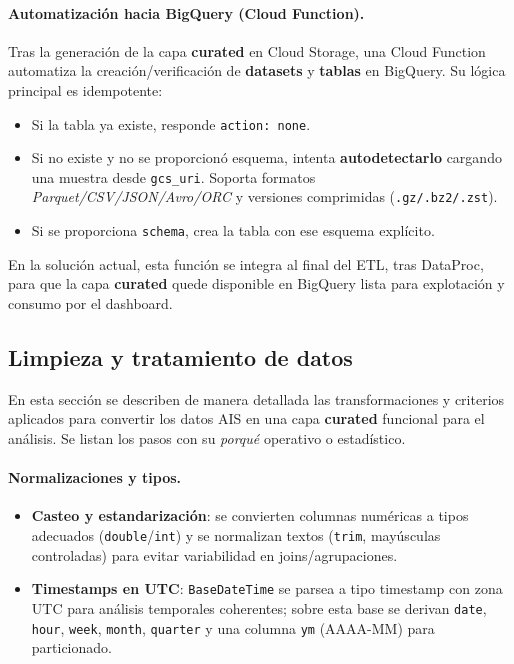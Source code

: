 \documentclass[10pt]{article}
\begin{document}
\paragraph{Automatización hacia BigQuery (Cloud Function).}
Tras la generación de la capa \textbf{curated} en Cloud Storage, una Cloud Function automatiza la creación/verificación de \textbf{datasets} y \textbf{tablas} en BigQuery. Su lógica principal es idempotente:
\begin{itemize}
    \item Si la tabla ya existe, responde \texttt{action: none}.
    \item Si no existe y no se proporcionó esquema, intenta \textbf{autodetectarlo} cargando una muestra desde \texttt{gcs\_uri}. Soporta formatos \textit{Parquet/CSV/JSON/Avro/ORC} y versiones comprimidas (\texttt{.gz/.bz2/.zst}).
    \item Si se proporciona \texttt{schema}, crea la tabla con ese esquema explícito.
\end{itemize}
En la solución actual, esta función se integra al final del ETL, tras DataProc, para que la capa \textbf{curated} quede disponible en BigQuery lista para explotación y consumo por el dashboard.
\subsection{Limpieza y tratamiento de datos} %

En esta sección se describen de manera detallada las transformaciones y criterios aplicados para convertir los datos AIS en una capa \textbf{curated} funcional para el análisis. Se listan los pasos con su \emph{porqué} operativo o estadístico.

\paragraph{Normalizaciones y tipos.}
\begin{itemize}
  \item \textbf{Casteo y estandarización}: se convierten columnas numéricas a tipos adecuados (\texttt{double}/\texttt{int}) y se normalizan textos (\texttt{trim}, mayúsculas controladas) para evitar variabilidad en joins/agrupaciones.
  \item \textbf{Timestamps en UTC}: \texttt{BaseDateTime} se parsea a tipo timestamp con zona UTC para análisis temporales coherentes; sobre esta base se derivan \texttt{date}, \texttt{hour}, \texttt{week}, \texttt{month}, \texttt{quarter} y una columna \texttt{ym} (AAAA-MM) para particionado.
\end{itemize}
\end{document}

